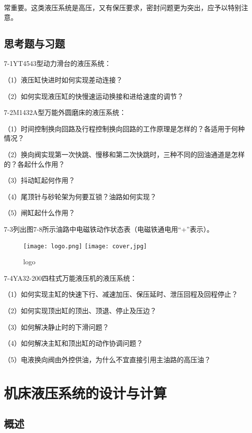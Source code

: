 常重要。这类液压系统是高压，又有保压要求，密封问题更为突出，应予以特别注意。


\section*{思考题与习题}

7-1\quad YT4543型动力滑台的液压系统：

（1）液压缸快进时如何实现差动连接？

（2）如何实现液压缸的快慢速运动换接和进给速度的调节？

7-2\quad M1432A型万能外圆磨床的液压系统：

（1）时间控制换向回路及行程控制换向回路的工作原理是怎样的？各适用于何种情况？

（2）换向阀实现第一次快跳、慢移和第二次快跳时，三种不同的回油通道是怎样的？各起什么作用？

（3）抖动缸起何作用？

（4）尾顶针与砂轮架为何要互锁？油路如何实现？

（5）闸缸起什么作用？

7-3\quad 列出图7-8所示油路中电磁铁动作状态表（电磁铁通电用“+”表示）。

\begin{figure}
    \centering
    \ifOpenSource
    \texttt{[image: logo.png]}
    \else
    \texttt{[image: cover,jpg]}
    \fi
    \caption{logo}
    \label{fig:fig0701}
 \end{figure}


7-4\quad YA32-200四柱式万能液压机的液压系统：

（1）如何实现主缸的快速下行、减速加压、保压延时、泄压回程及回程停止？

（2）如何实现顶出缸的顶出、顶退、停止及压边？

（3）如何解决静止时的下滑问题？

（4）如何解决主缸和顶出缸的动作协调问题？

（5）电液换向阀由外控供油，为什么不宜直接引用主油路的高压油？

\newpage

\chapter{机床液压系统的设计与计算}

\section{概述}

